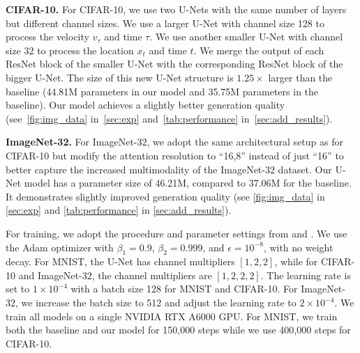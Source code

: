 \noindent \textbf{CIFAR-10.} For CIFAR-10, we use two U-Nets with the same number of layers but different channel sizes. We use a larger U-Net with channel size 128 to process the velocity $v_{\tau}$ and time $\tau$. We use another smaller U-Net with channel size 32 to process the location $x_t$ and time $t$. We merge the output of each ResNet block of the smaller U-Net with the corresponding ResNet block of the bigger U-Net. %
The size of this new U-Net structure is $1.25\times$ larger than the baseline (44.81M parameters in our model and 35.75M parameters in the baseline). Our model achieves a slightly better generation quality (see~\cref{fig:img_data} in~\cref{sec:exp} and~\cref{tab:performance} in~\cref{sec:add_results}).

\noindent \textbf{ImageNet-32.} For ImageNet-32, we adopt the same architectural setup as for CIFAR-10 but modify the attention resolution to ``16,8'' instead of just ``16'' to better capture the increased multimodality of the ImageNet-32 dataset. Our U-Net model has a parameter size of 46.21M, compared to 37.06M for the baseline. It demonstrates slightly improved generation quality (see \cref{fig:img_data} in \cref{sec:exp} and \cref{tab:performance} in \cref{sec:add_results}). 

For training, we adopt the procedure and parameter settings from \citet{tong2023improving} and \citet{LipmanICLR2023}. We use the Adam optimizer with $\beta_1=0.9$, $\beta_2=0.999$, and $\epsilon=10^{-8}$, with no weight decay. For MNIST, the U-Net has channel multipliers $ [1,2,2]$, while for CIFAR-10 and ImageNet-32, the channel multipliers are $ [1,2,2,2]$. The learning rate is set to $1\times 10^{-4}$ with a batch size 128 for MNIST and CIFAR-10. For ImageNet-32, we increase the batch size to 512 and adjust the learning rate to $2\times 10^{-4}$. We train all models on a single NVIDIA RTX A6000 GPU. For MNIST, we train both the baseline and our model for 150,000 steps while we use 400,000 steps for CIFAR-10. 




